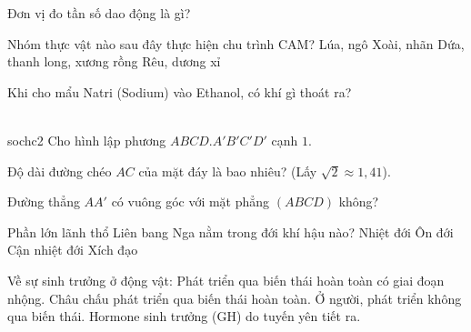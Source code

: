 \begin{ex}
    Đơn vị đo tần số dao động là gì?
\end{ex}

\begin{ex}
    Nhóm thực vật nào sau đây thực hiện chu trình CAM?
    \choice
    {Lúa, ngô}
    {Xoài, nhãn}
    {\True Dứa, thanh long, xương rồng}
    {Rêu, dương xỉ}
\end{ex}

\begin{ex}
    Khi cho mẩu Natri (Sodium) vào Ethanol, có khí gì thoát ra?
\end{ex}

\begin{ex}
    \\sochc{2}{
        Cho hình lập phương $ABCD.A'B'C'D'$ cạnh $1$.
    }
    \begin{chc}
        Độ dài đường chéo $AC$ của mặt đáy là bao nhiêu? (Lấy $\sqrt{2} \approx 1,41$).
    \end{chc}
    \begin{chc}
        Đường thẳng $AA'$ có vuông góc với mặt phẳng $(ABCD)$ không?
    \end{chc}
\end{ex}

\begin{ex}
    Phần lớn lãnh thổ Liên bang Nga nằm trong đới khí hậu nào?
    \choice
    {Nhiệt đới}
    {\True Ôn đới}
    {Cận nhiệt đới}
    {Xích đạo}
\end{ex}

\begin{ex}
    Về sự sinh trưởng ở động vật:
    \choiceTF
    {\True Phát triển qua biến thái hoàn toàn có giai đoạn nhộng.}
    {Châu chấu phát triển qua biến thái hoàn toàn.}
    {\True Ở người, phát triển không qua biến thái.}
    {\True Hormone sinh trưởng (GH) do tuyến yên tiết ra.}
\end{ex}

